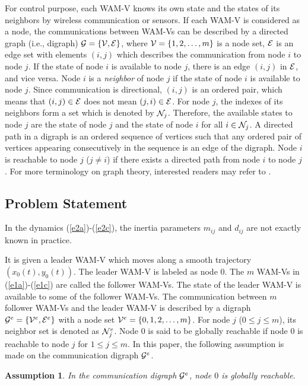 \documentclass[letterpaper, 10 pt, conference]{ieeeconf}  %
\newtheorem{assumption}{Assumption}
\begin{document}
For control purpose, each WAM-V knows its own state and
the states of its neighbors by wireless communication or sensors. If each WAM-V is considered as a node, the communications between WAM-Vs
can be described by a directed graph (i.e., digraph) ${\cal G}=\{{\cal V},{\cal E}\}$,
where ${\cal V}=\{1,2,\ldots,m\}$ is a node set, ${\cal E}$ is an
edge set with elements $(i,j)$ which describes the communication
from node $i$ to node $j$. If the state of node $i$ is available
to node $j$, there is an edge $(i,j)$ in ${\cal E}$, and vice
versa. Node $i$ is a {\em neighbor} of node $j$ if the
state of node $i$ is available to node $j$. Since communication
is directional, $(i,j)$ is an ordered pair, which means that
$(i,j)\in {\cal E}$ does not mean $(j,i)\in {\cal E}$. For node
$j$, the indexes of its neighbors form a set which is denoted by
${\cal N}_j$. Therefore, the available states to node $j$ are the state of node $j$ and the state of node $i$ for
all $i\in{\cal N}_j$.  A directed path
in a digraph is an ordered sequence of vertices such that any ordered pair of
vertices appearing consecutively in the sequence is an edge of the digraph.
Node $i$ is reachable to node $j$ ($j\not=i$) if there exists a directed path from node $i$ to node $j$.
For more terminology on graph theory, interested
readers may refer to \cite{chu97,mer98}.

\subsection{Problem Statement}


In the dynamics (\ref{e2a})-(\ref{e2c}), the inertia parameters $m_{ij}$ and $d_{ij}$ are not exactly known in practice. 

It is given a leader WAM-V which moves along a smooth trajectory $(x_0(t),y_0(t))$.
The leader WAM-V is labeled as node $0$. The $m$ WAM-Vs in (\ref{e1a})-(\ref{e1c}) are called the follower WAM-Vs.
The state of the leader WAM-V is available to some of the follower WAM-Vs. The communication between $m$ follower WAM-Vs and the leader WAM-V is described by a digraph ${\cal G}^e=\{{\cal V}^e,{\cal E}^e\}$ with a node set ${\cal V}^e=\{0,1,2,\ldots,m\}$. For node $j$ ($0\leq j\leq m$), its neighbor set is denoted as ${\cal N}_j^e$.  Node $0$ is said to be globally reachable if node $0$ is reachable to node $j$ for $1\leq j\leq m$. In this paper, the following assumption is made on the communication digraph ${\cal G}^e$.

\begin{assumption}
In the communication digraph ${\cal G}^e$, node $0$ is globally reachable.
\label{ass1}
\end{assumption}
\end{document}

